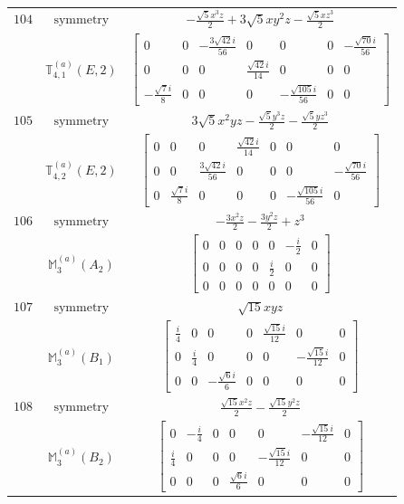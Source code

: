 \documentclass[fleqn,8pt,landscape]{jsarticle}
\begin{document}
\begin{longtable}{ccc}
$ 104 $ & $ \text{symmetry} $ & $ - \frac{\sqrt{5} x^{3} z}{2} + 3 \sqrt{5} x y^{2} z - \frac{\sqrt{5} x z^{3}}{2} $ \\
$  $ & $ \mathbb{T}_{4,1}^{(a)}(E,2) $ & $ \begin{bmatrix} 0 & 0 & - \frac{3 \sqrt{42} i}{56} & 0 & 0 & 0 & - \frac{\sqrt{70} i}{56} \\ 0 & 0 & 0 & \frac{\sqrt{42} i}{14} & 0 & 0 & 0 \\ - \frac{\sqrt{7} i}{8} & 0 & 0 & 0 & - \frac{\sqrt{105} i}{56} & 0 & 0 \end{bmatrix} $ \\ \hline
$ 105 $ & $ \text{symmetry} $ & $ 3 \sqrt{5} x^{2} y z - \frac{\sqrt{5} y^{3} z}{2} - \frac{\sqrt{5} y z^{3}}{2} $ \\
$  $ & $ \mathbb{T}_{4,2}^{(a)}(E,2) $ & $ \begin{bmatrix} 0 & 0 & 0 & \frac{\sqrt{42} i}{14} & 0 & 0 & 0 \\ 0 & 0 & \frac{3 \sqrt{42} i}{56} & 0 & 0 & 0 & - \frac{\sqrt{70} i}{56} \\ 0 & \frac{\sqrt{7} i}{8} & 0 & 0 & 0 & - \frac{\sqrt{105} i}{56} & 0 \end{bmatrix} $ \\ \hline
$ 106 $ & $ \text{symmetry} $ & $ - \frac{3 x^{2} z}{2} - \frac{3 y^{2} z}{2} + z^{3} $ \\
$  $ & $ \mathbb{M}_{3}^{(a)}(A_{2}) $ & $ \begin{bmatrix} 0 & 0 & 0 & 0 & 0 & - \frac{i}{2} & 0 \\ 0 & 0 & 0 & 0 & \frac{i}{2} & 0 & 0 \\ 0 & 0 & 0 & 0 & 0 & 0 & 0 \end{bmatrix} $ \\ \hline
$ 107 $ & $ \text{symmetry} $ & $ \sqrt{15} x y z $ \\
$  $ & $ \mathbb{M}_{3}^{(a)}(B_{1}) $ & $ \begin{bmatrix} \frac{i}{4} & 0 & 0 & 0 & \frac{\sqrt{15} i}{12} & 0 & 0 \\ 0 & \frac{i}{4} & 0 & 0 & 0 & - \frac{\sqrt{15} i}{12} & 0 \\ 0 & 0 & - \frac{\sqrt{6} i}{6} & 0 & 0 & 0 & 0 \end{bmatrix} $ \\ \hline
$ 108 $ & $ \text{symmetry} $ & $ \frac{\sqrt{15} x^{2} z}{2} - \frac{\sqrt{15} y^{2} z}{2} $ \\
$  $ & $ \mathbb{M}_{3}^{(a)}(B_{2}) $ & $ \begin{bmatrix} 0 & - \frac{i}{4} & 0 & 0 & 0 & - \frac{\sqrt{15} i}{12} & 0 \\ \frac{i}{4} & 0 & 0 & 0 & - \frac{\sqrt{15} i}{12} & 0 & 0 \\ 0 & 0 & 0 & \frac{\sqrt{6} i}{6} & 0 & 0 & 0 \end{bmatrix} $ \\ \hline

\end{longtable}
\end{document}
